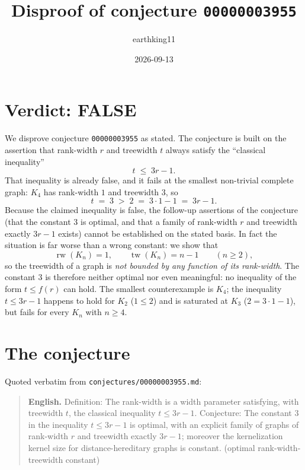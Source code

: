 \documentclass[11pt]{article}
\title{Disproof of conjecture \texttt{00000003955}}
\author{earthking11}
\date{2026-09-13}
\theoremstyle{definition}
\theoremstyle{remark}
\newcommand{\rw}{\operatorname{rw}}
\newcommand{\tw}{\operatorname{tw}}
\begin{document}
\maketitle

\section*{Verdict: FALSE}

We disprove conjecture \texttt{00000003955} as stated. The conjecture is built
on the assertion that rank-width $r$ and treewidth $t$ always satisfy the
``classical inequality''
\begin{equation}\label{eq:conj-ineq}
t \;\le\; 3r - 1 .
\end{equation}
That inequality is already false, and it fails at the smallest non-trivial
complete graph: $K_4$ has rank-width $1$ and treewidth $3$, so
\[
t \;=\; 3 \;>\; 2 \;=\; 3\cdot 1 - 1 \;=\; 3r - 1 .
\]
Because the claimed inequality is false, the follow-up assertions of the
conjecture (that the constant $3$ is optimal, and that a family of rank-width
$r$ and treewidth exactly $3r-1$ exists) cannot be established on the stated
basis. In fact the situation is far worse than a wrong constant: we show that
\[
\rw(K_n) = 1, \qquad \tw(K_n) = n - 1 \qquad (n \ge 2),
\]
so the treewidth of a graph is \emph{not bounded by any function of its
rank-width}. The constant $3$ is therefore neither optimal nor even meaningful:
no inequality of the form $t \le f(r)$ can hold. The smallest counterexample is
$K_4$; the inequality $t \le 3r-1$ happens to hold for $K_2$ ($1 \le 2$) and is
saturated at $K_3$ ($2 = 3\cdot 1 - 1$), but fails for every $K_n$ with
$n \ge 4$.

\section{The conjecture}

Quoted verbatim from \texttt{conjectures/00000003955.md}:

\begin{quote}
\textbf{English.} Definition: The rank-width is a width parameter satisfying,
with treewidth $t$, the classical inequality $t \le 3r - 1$. Conjecture: The
constant $3$ in the inequality $t \le 3r - 1$ is optimal, with an explicit
family of graphs of rank-width $r$ and treewidth exactly $3r - 1$; moreover the
kernelization kernel size for distance-hereditary graphs is constant. (optimal
rank-width-treewidth constant)
\end{quote}
\end{document}
